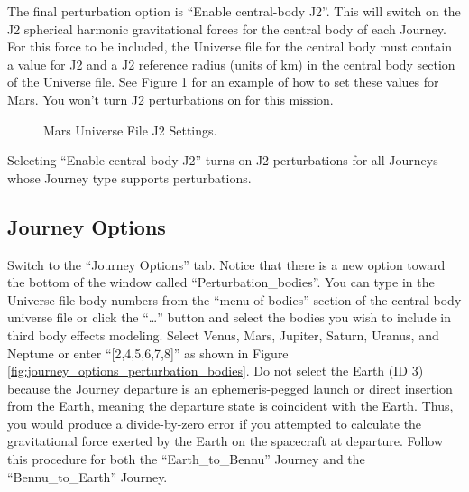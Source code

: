 \documentclass[11pt]{article}
\begin{document}
The final perturbation option is ``Enable central-body J2''. This will switch on the J2 spherical harmonic gravitational forces for the central body of each Journey. For this force to be included, the Universe file for the central body must contain a value for J2 and a J2 reference radius (units of km) in the central body section of the Universe file. See Figure \ref{fig:mars_universe_j2} for an example of how to set these values for Mars. You won’t turn J2 perturbations on for this mission. 

\begin{figure}[H]
	\centering
	\caption{\label{fig:mars_universe_j2}Mars Universe File J2 Settings.}
\end{figure}

\noindent Selecting ``Enable central-body J2'' turns on J2 perturbations for all Journeys whose Journey type supports perturbations.

\subsection{Journey Options}
\label{sec:journey_options}

Switch to the ``Journey Options'' tab. Notice that there is a new option toward the bottom of the window called ``Perturbation\_bodies''. You can type in the Universe file body numbers from the ``menu of bodies'' section of the central body universe file or click the ``…'' button and select the bodies you wish to include in third body effects modeling. Select Venus, Mars, Jupiter, Saturn, Uranus, and Neptune or enter ``[2,4,5,6,7,8]'' as shown in Figure \ref{fig:journey_options_perturbation_bodies}. Do not select the Earth (ID 3) because the Journey departure is an ephemeris-pegged launch or direct insertion from the Earth, meaning the departure state is coincident with the Earth. Thus, you would produce a divide-by-zero error if you attempted to calculate the gravitational force exerted by the Earth on the spacecraft at departure. Follow this procedure for both the “Earth\_to\_Bennu” Journey and the “Bennu\_to\_Earth” Journey.
\end{document}
